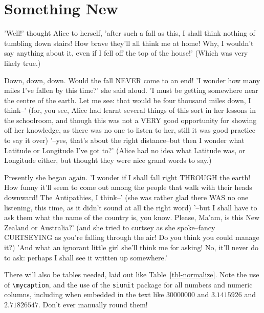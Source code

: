 \section{Something New}
\label{sec-somethingnew}

'Well!'
thought Alice to herself, 'after such a fall as this, I shall think
nothing of tumbling down stairs!
How brave they'll all think me at home!
Why, I wouldn't say anything about it, even if I fell off the top of
the house!'
(Which was very likely true.)

Down, down, down.
Would the fall NEVER come to an end!
'I wonder how many miles I've fallen by this time?'
she said aloud.
'I must be getting somewhere near the centre of the earth.
Let me see: that would be four thousand miles down, I think--' (for,
you see, Alice had learnt several things of this sort in her lessons
in the schoolroom, and though this was not a VERY good opportunity
for showing off her knowledge, as there was no one to listen to her,
still it was good practice to say it over) '--yes, that's about the
right distance--but then I wonder what Latitude or Longitude I've got
to?'
(Alice had no idea what Latitude was, or Longitude either, but
thought they were nice grand words to say.)

Presently she began again.
'I wonder if I shall fall right THROUGH the earth!
How funny it'll seem to come out among the people that walk with
their heads downward!
The Antipathies, I think--' (she was rather glad there WAS no one
listening, this time, as it didn't sound at all the right word)
'--but I shall have to ask them what the name of the country is, you
know.
Please, Ma'am, is this New Zealand or Australia?'
(and she tried to curtsey as she spoke--fancy CURTSEYING as you're
falling through the air!
Do you think you could manage it?)
'And what an ignorant little girl she'll think me for asking!
No, it'll never do to ask: perhaps I shall see it written up
somewhere.'


\begin{table}[t]
\centering

\aftertabspace
\end{table}

There will also be tables needed, laid out like
Table~\ref{tbl-normalize}.
Note the use of {\verb+\mycaption+}, and the use of the
{\verb+siunit+} package for all numbers and numeric columns,
including when embedded in the text like $\num{30000000}$ and
$\num{3.1415926}$ and $\num[round-precision=5]{2.71826547}$.
Don't ever manually round them!

